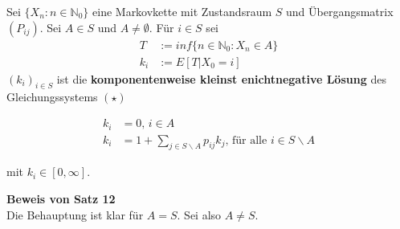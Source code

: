 \documentclass[a4paper,12pt]{article}
\begin{document}
\begin{tcolorbox}[breakable, colframe=green, colback=white, title=Satz 12]
	Sei $\{X_n: n \in \mathbb{N}_0\}$ eine Markovkette mit Zustandsraum $S$ und Übergangsmatrix $(P_{ij})$.
	Sei $A \in S$ und $A \neq \emptyset$. Für $i \in S$ sei
	\begin{align*}
		T   & := inf\{n \in \mathbb{N}_0: X_n \in A\} \\
		k_i & := E[T|X_0 = i]
	\end{align*}
	$(k_i)_{i \in S}$ ist die \textbf{komponentenweise kleinst enichtnegative Lösung} des Gleichungssystems $(\star)$

	\begin{align*}
		k_i & = 0 \text{, } i \in A                                                              \\
		k_i & = 1 + \sum_{j \in S \backslash A}p_{ij}k_j \text{, für alle } i \in S \backslash A
	\end{align*}

	mit $k_i \in [0, \infty]$.
\end{tcolorbox}
\textbf{Beweis von Satz 12}\\
Die Behauptung ist klar für $A=S$. Sei also $A \neq S$.
\end{document}
